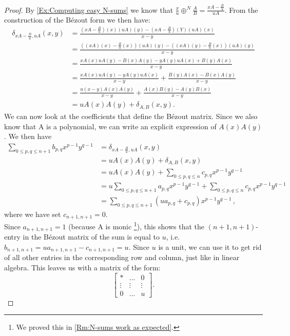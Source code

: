 \begin{lemma}
\begin{proof}
By \cref{Ex:Computing easy N-sums} we know that \(\frac{x}{u}\oplus^{N}\frac{A}{B} = \frac{xA-\frac{B}{u}}{uA}\). From the construction of the Bézout form we then have:
%
\begin{align*}
     \delta_{xA-\frac{B}{u}, uA}(x,y) 
     &= \frac{(xA-\frac{B}{u})(x)(uA)(y)-(xA-\frac{B}{u})(Y)(uA)(x)}{x-y} \\
     &= \frac{((xA)(x)-\frac{B}{u}(x))(uA)(y)-((xA)(y)-\frac{B}{u}(x))(uA)(y)}{x-y} \\
     &= \frac{xA(x)uA(y)-B(x)A(y)-yA(y)uA(x)+B(y)A(x)}{x-y} \\
     &= \frac{xA(x)uA(y)-yA(y)uA(x)}{x-y}+\frac{B(y)A(x)-B(x)A(y)}{x-y} \\
     &= \frac{u(x-y)A(x)A(y)}{x-y}+\frac{A(x)B(y)-A(y)B(x)}{x-y} \\
     &= uA(x)A(y)+\delta_{A,B}(x,y).
\end{align*}
%
We can now look at the coefficients that define the Bézout matrix. Since we also know that A is a polynomial, we can write an explicit expression of \(A(x)A(y)\). We then have
%
\begin{align*}
  \sum_{0\leq p,q \leq n+1}b_{p,q}x^{p-1}y^{q-1}  
    &= \delta_{xA-\frac{B}{u}, uA}(x,y) \\
    &= uA(x)A(y)+\delta_{A,B}(x,y)\\
    &= uA(x)A(y) + \sum_{0\leq p,q \leq n}c_{p,q}x^{p-1}y^{q-1} \\
    &= u\sum_{0\leq p,q \leq n+1}a_{p,q}x^{p-1}y^{q-1} + \sum_{0\leq p,q \leq n}c_{p,q}x^{p-1}y^{q-1} \\
    &= \sum_{0\leq p,q \leq n+1}(ua_{p,q}+c_{p,q})x^{p-1}y^{q-1}\,,
\end{align*}
%
where we have set \(c_{n+1,n+1}=0\). \\
Since \(a_{n+1,n+1}=1\) (because A is monic \footnote{ We proved this in \cref{Rm:N-sums work as expected}.}), this shows that the \((n+1,n+1)\)-entry in the Bézout matrix of the sum is equal to \(u\), i.e. \(b_{n+1,n+1}=ua_{n+1,n+1}-c_{n+1,n+1} = u\). Since \(u\) is a unit, we can use it to get rid of all other entries in the corresponding row and column, just like in linear algebra. This leaves us with a matrix of the form:
%
\begin{equation*}
%
\begin{bmatrix}
    * & \dots & 0 \\
    \vdots & \vdots & \vdots \\
    0 & \dots & u
\end{bmatrix} .
%

\end{equation*}
\end{proof}
\end{lemma}
